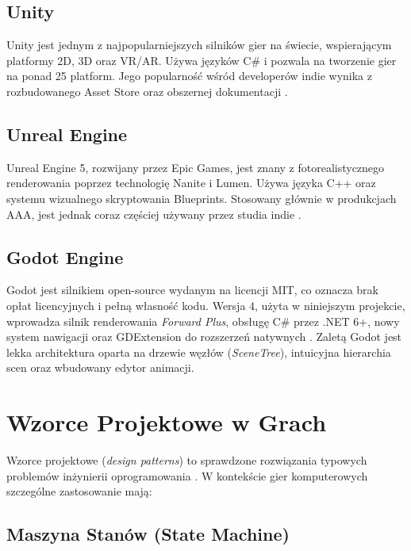 \subsection{Unity}

Unity jest jednym z najpopularniejszych silników gier na świecie, wspierającym platformy 2D, 3D oraz VR/AR. Używa języków C\# i pozwala na tworzenie gier na ponad 25 platform. Jego popularność wśród developerów indie wynika z rozbudowanego Asset Store oraz obszernej dokumentacji \cite{haas2014history}.

\subsection{Unreal Engine}

Unreal Engine 5, rozwijany przez Epic Games, jest znany z fotorealistycznego renderowania poprzez technologię Nanite i Lumen. Używa języka C++ oraz systemu wizualnego skryptowania Blueprints. Stosowany głównie w produkcjach AAA, jest jednak coraz częściej używany przez studia indie \cite{sherrod2007game}.

\subsection{Godot Engine}

Godot jest silnikiem open-source wydanym na licencji MIT, co oznacza brak opłat licencyjnych i pełną własność kodu. Wersja 4, użyta w niniejszym projekcie, wprowadza silnik renderowania \textit{Forward Plus}, obsługę C\# przez .NET 6+, nowy system nawigacji oraz GDExtension do rozszerzeń natywnych \cite{godot4docs}. Zaletą Godot jest lekka architektura oparta na drzewie węzłów (\textit{SceneTree}), intuicyjna hierarchia scen oraz wbudowany edytor animacji.

\section{Wzorce Projektowe w Grach}

Wzorce projektowe (\textit{design patterns}) to sprawdzone rozwiązania typowych problemów inżynierii oprogramowania \cite{gamma1994design}. W kontekście gier komputerowych szczególne zastosowanie mają:

\subsection{Maszyna Stanów (State Machine)}

